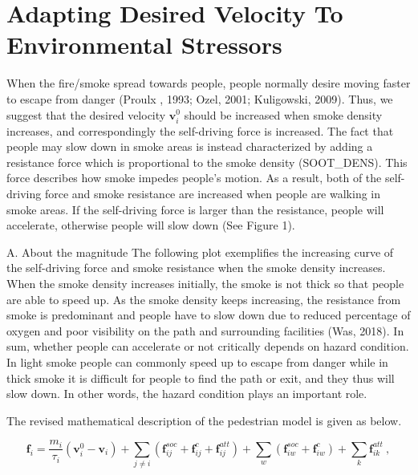 \documentclass{article}
\begin{document}
\section{Adapting Desired Velocity To Environmental Stressors}

When the fire/smoke spread towards people, people normally desire moving faster to escape from danger (Proulx , 1993; Ozel, 2001; Kuligowski, 2009).  Thus, we suggest that the desired velocity $\mathbf{v}_i^0$ should be increased when smoke density increases, and correspondingly the self-driving force is increased.  The fact that people may slow down in smoke areas is instead characterized by adding a resistance force which is proportional to the smoke density (SOOT_DENS).  This force describes how smoke impedes people's motion.  As a result, both of the self-driving force and smoke resistance are increased when people are walking in smoke areas.  If the self-driving force is larger than the resistance, people will accelerate, otherwise people will slow down (See Figure 1).  


A. About the magnitude
    The following plot exemplifies the increasing curve of the self-driving force and smoke resistance when the smoke density increases.  When the smoke density increases initially, the smoke is not thick so that people are able to speed up.  As the smoke density keeps increasing, the resistance from smoke is predominant and people have to slow down due to reduced percentage of oxygen and poor visibility on the path and surrounding facilities (Was, 2018).  In sum, whether people can accelerate or not critically depends on hazard condition.  In light smoke people can commonly speed up to escape from danger while in thick smoke it is difficult for people to find the path or exit, and they thus will slow down.  In other words, the hazard condition plays an important role.   
	
    The revised mathematical description of the pedestrian model is given as below.  
	
\begin{equation}\label{Eq_force}
  \mathbf{f}_i = \frac{m_i}{\tau_i} \left( \mathbf{v}_i^0 -
    \mathbf{v}_i\right) + \sum_{j \ne i} \left( \mathbf{f}_{ij}^{soc}
    + \mathbf{f}_{ij}^{c} + \mathbf{f}_{ij}^{att} \right) + \sum_{w}
  \left( \mathbf{f}^{soc}_{iw} + \mathbf{f}^{c}_{iw} \right) + \sum_{k}
  \mathbf{f}_{ik}^{att} ~,
\end{equation}
	
\end{document}
